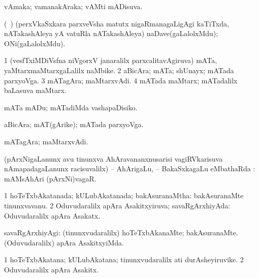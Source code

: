 \bentry
{} 
\gl{\gu}
\expl{}
\bmng
vAmaka; vamanakAraka; vAMti mADisuva. 
\emng
\eentry

\bentry 
{} 
\gl{\nA}
\bmng
 (\roV\ \pArxkatx) (perxVkaSxkara parxveVsha matutx nigaRmanagaLigAgi kaTiTxda, nATakashAleya yA vatuRla nATakashAleya) naDave(gaLalolxMdu); ONi(gaLalolxMdu). 
\emng
\eentry

\bentry 
{} 
\gl{\nA}
\expl{}
\bmng
\bnum
\num{1} (vesfTxiMDiVsfna niVgorxV janaralilx parxcalitavAgiruva) mATa, yaMtarxmaMtarxgaLalilx naMbike. 
\num{2} aBicAra; mATa; shUnayx; mATada parxyoVga. 
\num{3} mATagAra; maMtarxvAdi. 
\num{4} mATada maMtarx; mATadalilx baLasuva maMtarx. 
\enum
\emng
\eentry

\bentry
{} 
\gl{\sakirx}
\bmng
 mATa mADu; mATadiMda vashapaDisiko. 
\emng
\eentry

\bentry 
{} 
\gl{\nA}
\expl{}
\bmng
 aBicAra; mAT(gArike); mATada parxyoVga. 
\emng
\eentry

\bentry 
{} 
\gl{\nA}
\expl{}
\bmng
 mATagAra; maMtarxvAdi. 
\emng
\eentry

\bentry 
{} 
\gl{\saupa}
\expl{}
\bmng
 (pArxNigaLanunx avu tinunxva AhAravananxnusarisi vagiRVkarisuva nAmapadagaLanunx racisuvalilx) -- AhArigaLu, -- BakaSxkagaLu eMbathaRda \saupa :  mAMsAhAri (pArxNi)vagaR. 
\emng
\eentry

\bentry
{} 
\gl{\gu}
\expl{}
\bmng
\bnum
\num{1} hoTeTxbAkatanada; kULubAkatanada; bakAsuranaMtha:  bakAsuranaMte tinunxvavanu. 
\num{2} Oduvudaralilx apAra Asakitxyiruva; savaRgArxhiyAda:  Oduvudaralilx apAra Asakatx. 
\enum
\emng
\eentry

\bentry
{} 
\gl{\kirxvi}
\expl{}
\bmng
savaRgArxhiyAgi: 
\banum
{} (tinunxvudaralilx) hoTeTxbAkanaMte; bakAsuranaMte. 
 (Oduvudaralilx) apAra AsakitxyiMda. 
\eanum
\emng
\eentry

\bentry 
{} 
\gl{\nA}
\expl{}
\bmng
\bnum
\num{1} hoTeTxbAkatana; kULubAkatana; tinunxvudaralilx ati durAsheyiruvike. 
\num{2} Oduvudaralilx apAra Asakitx. 
\enum
\emng
\eentry

